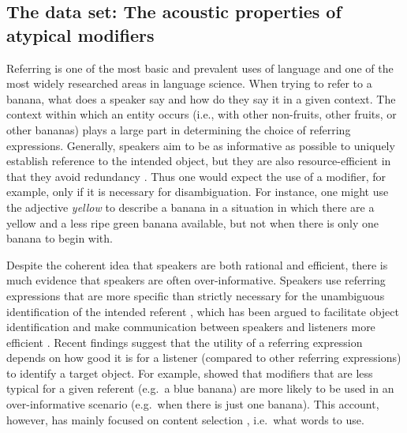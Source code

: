 \documentclass[Review,times,sageh]{sagej}
\begin{document}
\hypertarget{s:dataset}{%
\subsection{The data set: The acoustic properties of atypical modifiers}\label{s:dataset}}

Referring is one of the most basic and prevalent uses of language and one of the most widely researched areas in language science.
When trying to refer to a banana, what does a speaker say and how do they say it in a given context.
The context within which an entity occurs (i.e., with other non-fruits, other fruits, or other bananas) plays a large part in determining the choice of referring expressions.
Generally, speakers aim to be as informative as possible to uniquely establish reference to the intended object, but they are also resource-efficient in that they avoid redundancy \citep{grice1975logic}.
Thus one would expect the use of a modifier, for example, only if it is necessary for disambiguation.
For instance, one might use the adjective \emph{yellow} to describe a banana in a situation in which there are a yellow and a less ripe green banana available, but not when there is only one banana to begin with.

Despite the coherent idea that speakers are both rational and efficient, there is much evidence that speakers are often over-informative.
Speakers use referring expressions that are more specific than strictly necessary for the unambiguous identification of the intended referent \citep{sedivy2003pragmatic, westerbeek2015stored, rubio2016redundant}, which has been argued to facilitate object identification and make communication between speakers and listeners more efficient \citep{arts2011overspecification, paraboni2007generating, rubio2016redundant}.
Recent findings suggest that the utility of a referring expression depends on how good it is for a listener (compared to other referring expressions) to identify a target object.
For example, \citet{degen2020redundancy} showed that modifiers that are less typical for a given referent (e.g.~a blue banana) are more likely to be used in an over-informative scenario (e.g.~when there is just one banana).
This account, however, has mainly focused on content selection \citep{gatt2013we}, i.e.~what words to use.
\end{document}

